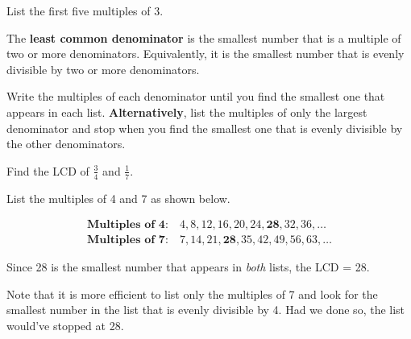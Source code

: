\documentclass{ximera}
\begin{document}
\begin{problem}
List the first five multiples of $3.$

\begin{multipleChoice}
\end{multipleChoice}
\end{problem}


\begin{definition}

The \textbf{least common denominator} is the smallest number that is a multiple of two or more denominators.  Equivalently, it is the smallest number that is
evenly divisible by two or more denominators.

\end{definition}

\begin{procedure}

Write the multiples of each denominator until you find the smallest one that appears in each list.  \textbf{Alternatively}, list
the multiples of only the largest denominator and stop when you find the smallest one that is evenly divisible by the other denominators.
\end{procedure}


\begin{example}

Find the LCD of $\frac{3}{4}$ and $\textstyle \frac{1}{7}.$


\begin{explanation}

List the multiples of 4 and 7 as shown below.

\begin{align*}
\textbf{Multiples of 4}: \ & 4, 8, 12, 16, 20, 24, \mathbf{28}, 32, 36, \ldots \\
\textbf{Multiples of 7}: \ & 7, 14, 21, \mathbf{28}, 35, 42, 49, 56, 63, \ldots
\end{align*}

Since 28 is the smallest number that appears in \textit{both} lists, the LCD = 28.

\begin{remark}
Note that it is more efficient to list only the multiples of 7 and look for the smallest number in the list that is
evenly divisible by 4.  Had we done so, the list would've stopped at 28.

\end{remark}
\end{explanation}

\end{example}
\end{document}
